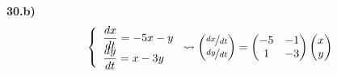 \begin{ejer}
    \textbf{30.b)}
    $$\left\{ \begin{array}{l}
         \dfrac{dx}{dt}=-5x-y  \\
         \vspace{-5mm} \\
         \dfrac{dy}{dt}=x-3y
    \end{array} \right. \rightsquigarrow \begin{pmatrix}
        \nicefrac{dx}{dt} \\
        \nicefrac{dy}{dt}        
    \end{pmatrix}=\begin{pmatrix}
        -5 & -1\\
        1 & -3
    \end{pmatrix}\begin{pmatrix}
        x\\
        y
    \end{pmatrix}$$
\end{ejer}
